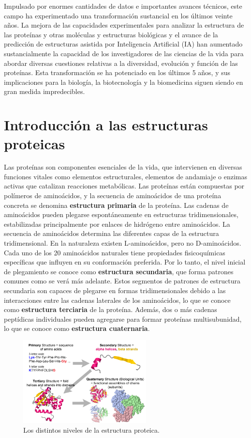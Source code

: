 Impulsado por enormes cantidades de datos e importantes avances técnicos, este campo ha experimentado una transformación sustancial en los últimos veinte años. La mejora de las capacidades experimentales para analizar la estructura de las proteínas y otras moléculas y estructuras biológicas y el avance de la predicción de estructuras asistida por Inteligencia Artificial (IA) han aumentado sustancialmente la capacidad de los investigadores de las ciencias de la vida para abordar diversas cuestiones relativas a la diversidad, evolución y función de las proteínas. Esta transformación se ha potenciado en los últimos 5 años, y sus implicaciones para la biología, la biotecnología y la biomedicina siguen siendo en gran medida impredecibles.

\section{Introducción a las estructuras proteicas}
Las proteínas son componentes esenciales de la vida, que intervienen en diversas funciones vitales como elementos estructurales, elementos de andamiaje o enzimas activas que catalizan reacciones metabólicas. Las proteínas están compuestas por polímeros de aminoácidos, y la secuencia de aminoácidos de una proteína concreta se denomina \textbf{estructura primaria} de la proteína. Las cadenas de aminoácidos pueden plegarse espontáneamente en estructuras tridimensionales, estabilizadas principalmente por enlaces de hidrógeno entre aminoácidos. La secuencia de aminoácidos determina las diferentes capas de la estructura tridimensional. En la naturaleza existen L-aminoácidos, pero no D-aminoácidos. Cada uno de los 20 aminoácidos naturales tiene propiedades fisicoquímicas específicas que influyen en su conformación preferida. Por lo tanto, el nivel inicial de plegamiento se conoce como \textbf{estructura secundaria}, que forma patrones comunes como se verá más adelante. Estos segmentos de patrones de estructura secundaria son capaces de plegarse en formas tridimensionales debido a las interacciones entre las cadenas laterales de los aminoácidos, lo que se conoce como \textbf{estructura terciaria} de la proteína. Además, dos o más cadenas peptídicas individuales pueden agregarse para formar proteínas multisubunidad, lo que se conoce como \textbf{estructura cuaternaria}.

\begin{figure}[h]
\centering
\includegraphics[width = 0.6\textwidth]{figs/850px-Protein-structure-4-levels-III-flat.png}
\caption{Los distintos niveles de la estructura proteica.}
\end{figure}

